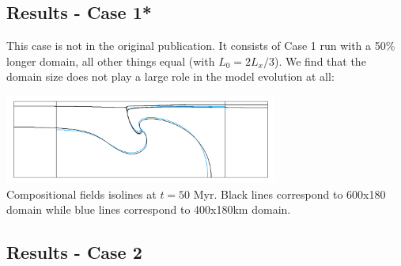 \subsection*{Results - Case 1* }

This case is not in the original publication. It consists of Case 1 run with a 
50\% longer domain, all other things equal (with $L_0=2L_x/3$). We find that the domain size does not
play a large role in the model evolution at all: 

\begin{center}
\includegraphics[width=9cm]{python_codes/fieldstone_118/results/case1b/isos}\\
{\captionfont Compositional fields isolines at $t=50$ Myr. Black lines correspond
to 600x180 domain while blue lines correspond to 400x180km domain.}
\end{center}

\subsection*{Results - Case 2}


